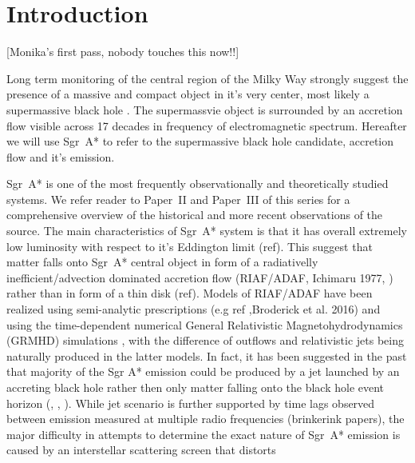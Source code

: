 \section{Introduction}\label{sec:intro}
\color{red}
[Monika's first pass, nobody touches this now!!]
\color{black}

Long term monitoring of the central region of the Milky Way strongly suggest the presence of a massive and compact object in it's very center, most likely a supermassive black hole \citep{2019Sci...365..664D}. The supermassvie object is surrounded by an accretion flow visible across 17 decades in frequency of electromagnetic spectrum. Hereafter we will use Sgr~A* to refer to the supermassive black hole candidate, accretion flow and it's emission. 

Sgr~A* is one of the most frequently observationally and theoretically studied systems.  We refer reader to Paper~II and Paper~III of this series for a comprehensive overview of the historical and more recent observations of the source. The main characteristics of Sgr~A* system is that it has overall extremely low luminosity with respect to it's Eddington limit (ref). This suggest that matter falls onto Sgr~A* central object in form of a radiativelly inefficient/advection dominated accretion flow (RIAF/ADAF, Ichimaru 1977, \citealt{1994ApJ...428L..13N, 1995ApJ...444..231N,
  1995ApJ...452..710N, 1996A&AS..120C.287N, 1998ApJ...492..554N}) rather than in form of a thin disk (ref). Models of RIAF/ADAF have been realized using semi-analytic prescriptions (e.g ref ,Broderick et al. 2016) and using the time-dependent numerical General Relativistic Magnetohydrodynamics (GRMHD) simulations \citep[e.g.,][]{2000ApJ...528..462H, 2003ApJ...589..458D,
  2003ApJ...589..444G, 2007CQGra..24S.235G, 2012ApJS..201....9F,
  2014ApJ...796...22F, 2016ApJS..225...22W, 2017ApJS..231...17A,
  2018JPhCS1031a2008O, 2019A&A...629A..61O, 2019ApJS..243...26P}, with the difference of outflows and
relativistic jets being naturally produced in the latter models. In fact, it has been suggested in the past that majority of the Sgr A* emission could be produced by a jet launched by an accreting black hole rather then only matter falling onto the black hole event horizon (\cite{2000A&A...362..113F}, \citealt{2004A&A...414..895F}, \citealt{2005ApJ...635.1203M}). While jet scenario is further supported by time lags observed between emission measured at multiple radio frequencies (brinkerink papers), the major difficulty in attempts to determine the exact nature of Sgr~A* emission is caused by an interstellar scattering screen that distorts 

